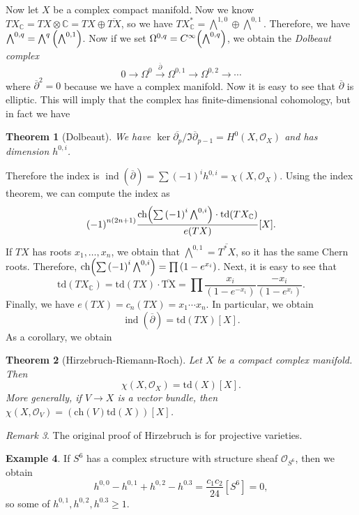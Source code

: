 \documentclass[leqno, openany]{memoir}
\newtheorem{thm}{Theorem}[section]
\theoremstyle{definition}
\newtheorem{exm}[thm]{Example}
\theoremstyle{remark}
\newtheorem{rmk}[thm]{Remark}
\theoremstyle{plain}
\theoremstyle{definition}
\theoremstyle{remark}
\newcommand{\C}{\mathbb{C}}
\newcommand{\mc}[1]{\mathcal{#1}}
\newcommand{\mr}[1]{\mathrm{#1}}
\newcommand{\ol}[1]{\overline{#1}}
\DeclareMathOperator{\ind}{ind}
\begin{document}
Now let $X$ be a complex compact manifold. Now we know $TX_{\C} = TX \otimes \C = TX \oplus \ol{TX}$, so we have $TX_{\C}^* = \bigwedge^{1,0} \oplus \bigwedge^{0,1}$. Therefore, we have $\bigwedge^{0,q} = \bigwedge^q \qty(\bigwedge^{0,1})$. Now if we set $\Omega^{0,q} = C^{\infty}\qty(\bigwedge^{0,q})$, we obtain the \textit{Dolbeaut complex}
\[ 0 \to \Omega^0 \xrightarrow{\ol{\partial}} \Omega^{0,1} \to \Omega^{0,2} \to \cdots \]
where $\ol{\partial}^2 = 0$ because we have a complex manifold. Now it is easy to see that $\ol{\partial}$ is elliptic. This will imply that the complex has finite-dimensional cohomology, but in fact we have
\begin{thm}[Dolbeaut]
    We have $\ker \ol{\partial_p}/\Im \ol{\partial}_{p-1} = H^0(X, \mc{O}_X)$ and has dimension $h^{0,i}$.
\end{thm}
Therefore the index is $\ind(\ol{\partial}) = \sum {(-1)}^i h^{0,i} = \chi(X, \mc{O}_X)$. Using the index theorem, we can compute the index as 
\begin{align*}
    {(-1)}^{n(2n+1)} \frac{\mr{ch}\qty(\sum {(-1)}^i \bigwedge^{0,i}) \cdot \mr{td}(TX_{\C})}{e(TX)} [X].
\end{align*}
If $TX$ has roots $x_1, \ldots, x_n$, we obtain that $\bigwedge^{0,1} = \ol{T^*X}$, so it has the same Chern roots. Therefore, $\mr{ch}\qty(\sum {(-1)}^i \bigwedge^{0,i}) = \prod {(1-e^{x_i})}$. Next, it is easy to see that 
\[ \mr{td}(TX_{\C}) = \mr{td}(TX) \cdot \mr{\ol{TX}} = \prod \frac{x_i}{(1-e^{-x_i})} \frac{-x_i}{(1-e^{x_i})}. \]
Finally, we have $e(TX) = c_n(TX) = x_1 \cdots x_n$. In particular, we obtain
\[ \ind(\ol{\partial}) = \mr{td}(TX) [X]. \]
As a corollary, we obtain
\begin{thm}[Hirzebruch-Riemann-Roch]
    Let $X$ be a compact complex manifold. Then 
    \[ \chi(X, \mc{O}_X) = \mr{td}(X) [X]. \]
    More generally, if $V \to X$ is a vector bundle, then $\chi(X, \mc{O}_V) = (\mr{ch}(V) \mr{td}(X)) [X]$.
\end{thm}

\begin{rmk}
    The original proof of Hirzebruch is for projective varieties.
\end{rmk}

\begin{exm}
    If $S^6$ has a complex structure with structure sheaf $\mc{O}_{S^6}$, then we obtain
    \[ h^{0,0} - h^{0,1} + h^{0,2} - h^{0.3} = \frac{c_1 c_2}{24} [S^6] = 0, \]
    so some of $h^{0,1}, h^{0,2}, h^{0.3} \geq 1$.
\end{exm}
\end{document}
